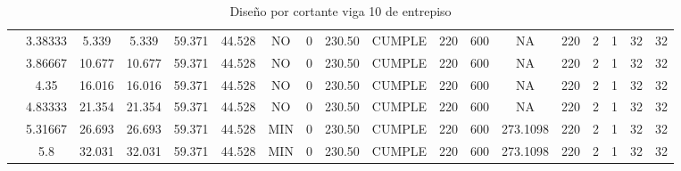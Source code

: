 \begin{table}[H]
{\begin{tabular}{|c|c|c|c|c|c|c|c|c|c|c|c|c|c|c|c|c|c|}
\cline{2-18}          & 3.38333 & 5.339 & 5.339 & 59.371 & 44.528 & NO    & 0     & 230.50 & CUMPLE & 220   & 600   & NA    & 220   & 2     & 1     & 32    & 32 \bigstrut\\
\cline{2-18}          & 3.86667 & 10.677 & 10.677 & 59.371 & 44.528 & NO    & 0     & 230.50 & CUMPLE & 220   & 600   & NA    & 220   & 2     & 1     & 32    & 32 \bigstrut\\
\cline{2-18}          & 4.35  & 16.016 & 16.016 & 59.371 & 44.528 & NO    & 0     & 230.50 & CUMPLE & 220   & 600   & NA    & 220   & 2     & 1     & 32    & 32 \bigstrut\\
\cline{2-18}          & 4.83333 & 21.354 & 21.354 & 59.371 & 44.528 & NO    & 0     & 230.50 & CUMPLE & 220   & 600   & NA    & 220   & 2     & 1     & 32    & 32 \bigstrut\\
\cline{2-18}          & 5.31667 & 26.693 & 26.693 & 59.371 & 44.528 & MIN   & 0     & 230.50 & CUMPLE & 220   & 600   & 273.1098 & 220   & 2     & 1     & 32    & 32 \bigstrut\\
\cline{2-18}          & 5.8   & 32.031 & 32.031 & 59.371 & 44.528 & MIN   & 0     & 230.50 & CUMPLE & 220   & 600   & 273.1098 & 220   & 2     & 1     & 32    & 32 \bigstrut\\
    \hline
    \end{tabular}}%
  \caption{Diseño por cortante viga 10 de entrepiso}
  \label{tab:Cort V10E}%
\end{table}%
